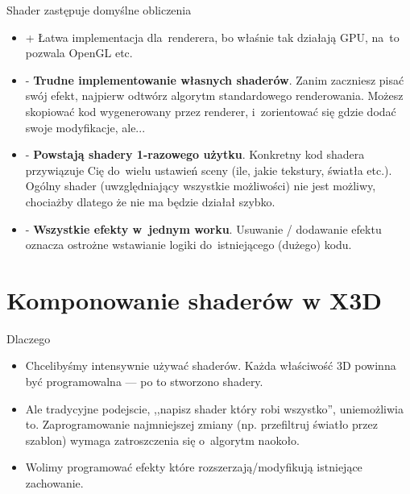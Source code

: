 \documentclass{beamer}
\begin{document}
\begin{frame}{Shader zastępuje domyślne obliczenia}

\begin{itemize}
  \item + Łatwa implementacja dla~renderera, bo właśnie tak działają GPU,
    na~to pozwala OpenGL etc.
  \item - \textbf{Trudne implementowanie własnych shaderów}.
    Zanim zaczniesz pisać swój efekt, najpierw odtwórz algorytm
    standardowego renderowania.
    Możesz skopiować kod wygenerowany przez renderer,
    i~zorientować się gdzie dodać swoje modyfikacje, ale...
  \item - \textbf{Powstają shadery 1-razowego użytku}.
    Konkretny kod shadera przywiązuje Cię do~wielu ustawień sceny
    (ile, jakie tekstury, światła etc.).
    Ogólny shader (uwzględniający wszystkie możliwości) nie jest możliwy,
    chociażby dlatego że nie ma będzie działał szybko.
  \item - \textbf{Wszystkie efekty w~jednym worku}.
    Usuwanie / dodawanie efektu oznacza ostrożne wstawianie logiki
    do~istniejącego (dużego) kodu.
\end{itemize}
\end{frame}

\section{Komponowanie shaderów w X3D}

\begin{frame}{Dlaczego}
\begin{itemize}
  \item Chcelibyśmy intensywnie używać shaderów. Każda właściwość 3D powinna
    być programowalna --- po to stworzono shadery.

  \item Ale tradycyjne podejscie, ,,napisz shader który robi wszystko'',
    uniemożliwia to. Zaprogramowanie najmniejszej zmiany (np. przefiltruj
    światło przez szablon) wymaga zatroszczenia się o~algorytm naokoło.

  \item Wolimy programować efekty które rozszerzają/modyfikują
    istniejące zachowanie.
\end{itemize}
\end{frame}
\end{document}

